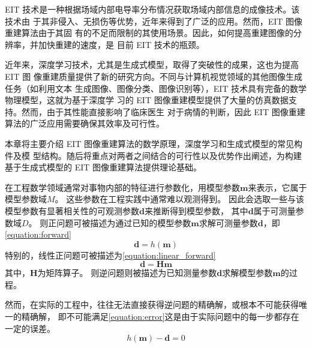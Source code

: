 

EIT 技术是一种根据场域内部电导率分布情况获取场域内部信息的成像技术。该技术由
于其非侵入、无损伤等优势，近年来得到了广泛的应用。然而，EIT 图像重建算法由于其固
有的不足而限制的其使用场景。因此，如何提高重建图像的分辨率，并加快重建的速度，是
目前 EIT 技术的瓶颈。

近年来，深度学习技术，尤其是生成式模型，取得了突破性的成果，这也为提高 EIT 图
像重建质量提供了新的研究方向。不同与计算机视觉领域的其他图像生成任务（如利用文本
生成图像、图像分类、图像识别等），EIT 技术具有完备的数学物理模型，这就为基于深度学
习的 EIT 图像重建模型提供了大量的仿真数据支持。然而，由于其性能直接影响了临床医生
对于病情的判断，因此 EIT 图像重建算法的广泛应用需要确保其效率及可行性。

本章将主要介绍 EIT 图像重建算法的数学原理，深度学习和生成式模型的常见构件及模
型结构。随后将重点对两者之间结合的可行性以及优势作出阐述，为构建基于生成式模型的
EIT 图像重建算法提供理论基础。


在工程数学领域通常对事物内部的特征进行参数化，用模型参数$\boldsymbol{m}$来表示，它属于模型参数域$M$。
这些参数在工程实践中通常难以观测得到。
因此会选取一些与该模型参数有显著相关性的可观测参数$\boldsymbol{d}$来推断得到模型参数，
其中$\boldsymbol{d}$属于可测量参数域$D$。
则正问题可被描述为通过已知的模型参数$\boldsymbol{m}$求解可测量参数$\boldsymbol{d}$，即\cref{equation:forward}
\begin{equation}
  \label{equation:forward}
  \boldsymbol{d} = h(\boldsymbol{m})
\end{equation}
特别的，线性正问题可被描述为\cref{equation:linear_forward}
\begin{equation}
  \label{equation:linear_forward}
  \boldsymbol{d} = \boldsymbol{H}\boldsymbol{m}
\end{equation}
其中，$\boldsymbol{H}$为矩阵算子。
则逆问题则被描述为已知测量参数$\boldsymbol{d}$求解模型参数$\boldsymbol{m}$的过程。

然而，在实际的工程中，往往无法直接获得逆问题的精确解，或根本不可能获得唯一的精确解，
即不可能满足\cref{equation:error}这是由于实际问题中的每一步都存在一定的误差。
\begin{equation}
  \label{equation:error}
  h(\boldsymbol{m}) - \boldsymbol{d} = 0
\end{equation}

